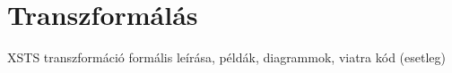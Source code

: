 \section{Transzformálás}


XSTS transzformáció formális leírása, példák, diagrammok, viatra kód (esetleg)
